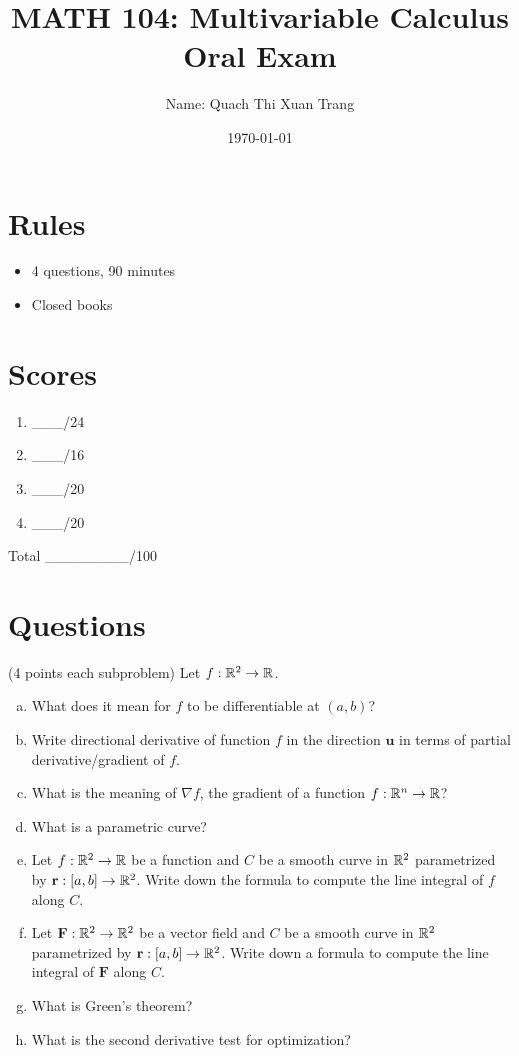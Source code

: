 \documentclass[12pt]{article}
\title{ MATH 104: Multivariable Calculus Oral Exam}
\author{Name: Quach Thi Xuan Trang}
\date{\today}
\newcommand{\vect}{\mathbf}
\begin{document}
\maketitle

\section*{Rules}

\begin{itemize}
    \item 4 questions, 90 minutes
    \item Closed books
\end{itemize}

\section*{Scores}

\begin{enumerate}[Problem 1.]
    \item  \_\_\_/24
    \item  \_\_\_/16
    \item \_\_\_/20
    \item  \_\_\_/20
\end{enumerate}
Total \_\_\_\_\_\_\_\_/100


\newpage
\section*{Questions}

\begin{problem}
    (4 points each subproblem)
    Let $f:\mathbb{R}^2 \to \mathbb{R}$.
    \begin{enumerate}[(a)]
        \item  What does it mean for $f$ to be 
            differentiable at $(a,b)$?
        \item Write directional derivative of function $f$ in the direction $\textbf{u}$ in terms of partial derivative/gradient of $f$.
        \item What is the meaning of $\nabla f$, the gradient of a function $f:\mathbb{R}^n \to \mathbb{R}$?
        \item What is a parametric curve?
        \item Let $f:\mathbb{R}^2 \to \mathbb{R}$ be a function and $C$ be a smooth curve in $\mathbb{R}^2$ parametrized by $\vect{r}:[a,b]\to \R^2$. Write down the formula to compute the line integral of $f$ along $C$.
        \item Let $\vect{F}:\R^2 \to \R^2$ be a vector field and $C$ be a smooth curve in $\mathbb{R}^2$ parametrized by $\vect{r}:[a,b]\to \R^2$. Write down a formula to compute the line integral of $\vect{F}$ along $C$.
        \item What is Green's theorem?
        \item What is the second derivative test for optimization?
    \end{enumerate}
\end{problem}
\end{document}
